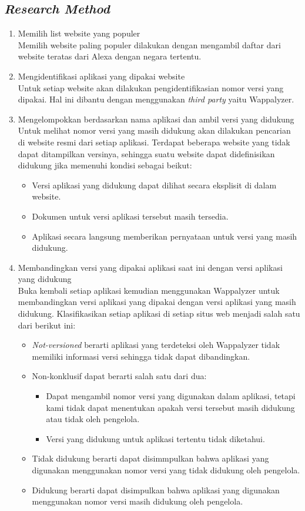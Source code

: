 \subsection{\textit{Research Method}}
\begin{enumerate}
	\item Memilih list website yang populer\\
	Memilih website paling populer dilakukan dengan mengambil daftar dari website teratas dari Alexa dengan negara tertentu.
	\item Mengidentifikasi aplikasi yang dipakai website\\
	Untuk setiap website akan dilakukan pengidentifikasian nomor versi yang dipakai. Hal ini dibantu dengan menggunakan \textit{third party} yaitu Wappalyzer. 
	\item Mengelompokkan berdasarkan nama aplikasi dan ambil versi yang didukung\\
	Untuk melihat nomor versi yang masih didukung akan dilakukan pencarian di website resmi dari setiap aplikasi. Terdapat beberapa website yang tidak dapat ditampilkan versinya, sehingga suatu website dapat didefinisikan didukung jika memenuhi kondisi sebagai beikut:
	\begin{itemize}
		\item Versi aplikasi yang didukung dapat dilihat secara eksplisit di dalam website.
		\item Dokumen untuk versi aplikasi tersebut masih tersedia.
		\item Aplikasi secara langsung memberikan pernyataan untuk versi yang masih didukung.
	\end{itemize}
	
	\item Membandingkan versi yang dipakai aplikasi saat ini dengan versi aplikasi yang didukung\\
	Buka kembali setiap aplikasi kemudian menggunakan Wappalyzer untuk membandingkan versi aplikasi yang dipakai dengan versi aplikasi yang masih didukung. Klasifikasikan setiap aplikasi di setiap situs web menjadi salah satu dari berikut ini:
	\begin{itemize}
		\item \textit{Not-versioned} berarti aplikasi yang terdeteksi oleh Wappalyzer tidak memiliki informasi versi sehingga tidak dapat dibandingkan.
		\item Non-konklusif dapat berarti salah satu dari dua:
		\begin{itemize}
			\item Dapat mengambil nomor versi yang digunakan dalam aplikasi, tetapi kami tidak dapat menentukan apakah versi tersebut masih didukung atau tidak oleh pengelola.
			\item Versi yang didukung untuk aplikasi tertentu tidak diketahui.
		\end{itemize}
		\item Tidak didukung berarti dapat disimmpulkan bahwa aplikasi yang digunakan menggunakan nomor versi yang tidak didukung oleh pengelola.
		\item Didukung berarti dapat disimpulkan bahwa aplikasi yang digunakan menggunakan nomor versi masih didukung oleh pengelola.
	\end{itemize}
	
	
\end{enumerate}

